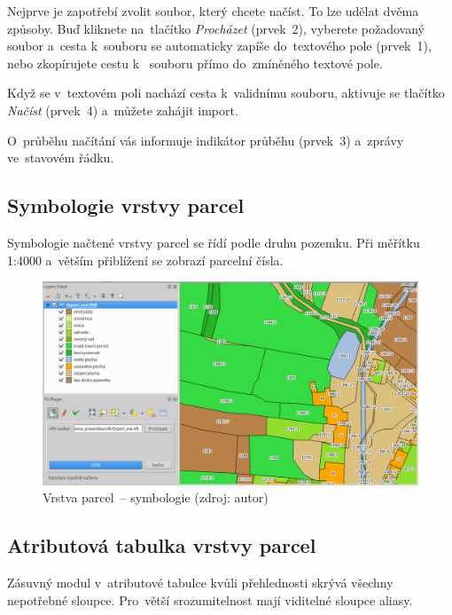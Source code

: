 Nejprve je zapotřebí zvolit  soubor, který chcete načíst. To
lze udělat dvěma způsoby. Buď kliknete na~tlačítko \textit{Procházet}
(prvek~2), vyberete požadovaný soubor a~cesta k~souboru se automaticky
zapíše do~textového pole (prvek~1), nebo zkopírujete cestu k~
souboru přímo do~zmíněného textové pole.

Když se v~textovém poli nachází cesta k~validnímu  souboru,
aktivuje se tlačítko \textit{Načíst} (prvek~4) a~můžete zahájit
import.

O~průběhu načítání vás informuje indikátor průběhu (prvek~3) a~zprávy
ve~stavo\-vém řádku.

\subsection{Symbologie vrstvy parcel}
\label{manual_nacteni_symbologie}

Symbologie načtené vrstvy parcel se řídí podle druhu pozemku. Při
měřítku 1:4000 a~větším přiblížení se zobrazí parcelní čísla.

	\begin{figure}[H] \centering
		\includegraphics[width=.9\textwidth]{./pictures/symbologie_par.png}
		\caption[Vrstva parcel~– symbologie]{Vrstva parcel~–
symbologie (zdroj: autor)}
		\label{fig:manual_symbologie_par}
 	\end{figure}

\subsection{Atributová tabulka vrstvy parcel}
\label{manual_nacteni_tabulka}

Zásuvný modul v~atributové tabulce kvůli přehlednosti skrývá všechny
nepotřebné sloupce. Pro~větší srozumitelnost mají viditelné sloupce
aliasy.

